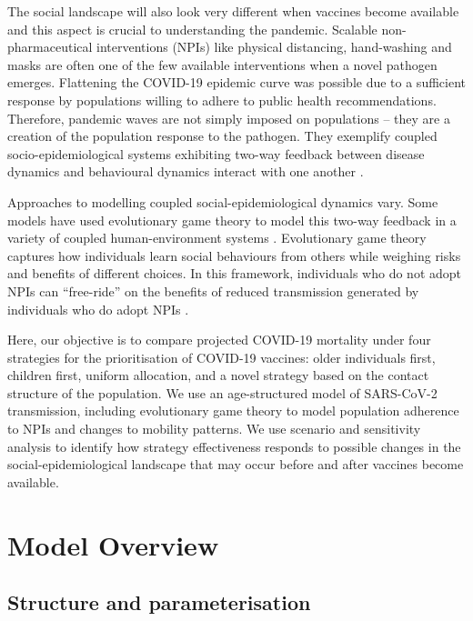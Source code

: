 The social landscape will also look very different when vaccines become available and this aspect is crucial to understanding the pandemic. Scalable non-pharmaceutical interventions (NPIs) like physical distancing, hand-washing and masks are often one of the few available interventions when a novel pathogen emerges. Flattening the COVID-19 epidemic curve was possible due to a sufficient response by populations willing to adhere to public health recommendations. Therefore, pandemic waves are not simply imposed on populations -- they are a creation of the population response to the pathogen. They exemplify coupled socio-epidemiological systems exhibiting two-way feedback between disease dynamics and behavioural dynamics interact with one another \cite{pedro2020conditions}.

Approaches to modelling coupled social-epidemiological dynamics vary\cite{reluga2010game,salathe2008effect,funk2009spread,verelst2016behavioural,funk2010modelling}.  Some models have used evolutionary game theory to model this two-way feedback in a variety of coupled human-environment systems \cite{pedro2020conditions,bauch2005imitation,innes2013impact,bury2019charting,amaral2020epidemiological,zhao2020imitation,alam2020based}.  Evolutionary game theory captures how individuals learn social behaviours from others while weighing risks and benefits of different choices. In this framework, individuals who do not adopt NPIs can “free-ride” on the benefits of reduced transmission generated by individuals who do adopt NPIs \cite{reluga2010game}. 

Here, our objective is to compare projected COVID-19 mortality under four strategies for the prioritisation of COVID-19 vaccines: older individuals first, children first, uniform allocation, and a novel strategy based on the contact structure of the population. We use an age-structured model of SARS-CoV-2 transmission, including evolutionary game theory to model population adherence to NPIs and changes to mobility patterns.  We use scenario and sensitivity analysis to identify how strategy effectiveness responds to possible changes in the social-epidemiological landscape that may occur before and after vaccines become available.  

\section{Model Overview}

\subsection{Structure and parameterisation}

